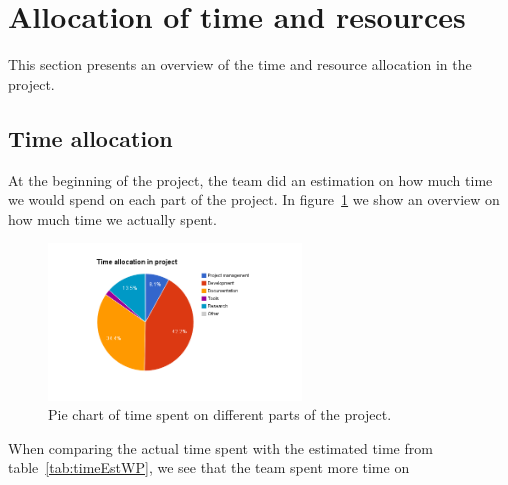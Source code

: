 \section{Allocation of time and resources}

This section presents an overview of the time and resource allocation in the project.

\subsection{Time allocation}
At the beginning of the project, the team did an estimation on how much time we would spend on each part of the project. In figure~\ref{fig:piechart} we show an overview on how much time we actually spent.

\begin{figure}[H]
\centering
\includegraphics[width=0.6\textwidth, clip, trim=4cm 2cm 4cm 1cm]{ch/retrospect/fig/timePie.png}
\caption{Pie chart of time spent on different parts of the project.}
\label{fig:piechart}
\end{figure}

When comparing the actual time spent with the estimated time from table~\ref{tab:timeEstWP}, we see that the team spent more time on 


